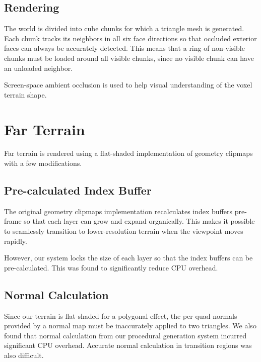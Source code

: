 \subsection{Rendering}

The world is divided into cube chunks for which a triangle mesh is generated.
Each chunk tracks its neighbors in all six face directions so that occluded exterior faces can always be accurately detected.
This means that a ring of non-visible chunks must be loaded around all visible chunks, since no visible chunk can have an unloaded neighbor.

Screen-space ambient occlusion is used to help visual understanding of the voxel terrain shape.


\section{Far Terrain} \label{clipterrain} %

Far terrain is rendered using a flat-shaded implementation of geometry clipmaps with a few modifications.

\subsection{Pre-calculated Index Buffer}

The original geometry clipmaps implementation recalculates index buffers pre-frame so that each layer can grow and expand organically.
This makes it possible to seamlessly transition to lower-resolution terrain when the viewpoint moves rapidly.

However, our system locks the size of each layer so that the index buffers can be pre-calculated.
This was found to significantly reduce CPU overhead.

\subsection{Normal Calculation}

Since our terrain is flat-shaded for a polygonal effect, the per-quad normals provided by a normal map must be inaccurately applied to two triangles.
We also found that normal calculation from our procedural generation system incurred significant CPU overhead.
Accurate normal calculation in transition regions was also difficult.

